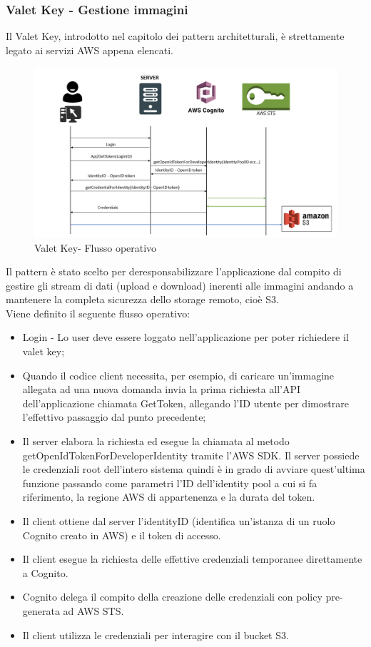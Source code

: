 \documentclass[12pt]{article}
\begin{document}
\subsubsection{Valet Key - Gestione immagini}
\label{sec:valet}
Il Valet Key, introdotto nel capitolo dei pattern architetturali, è strettamente legato ai servizi AWS appena elencati.
\begin{figure}[H]
\includegraphics[scale=0.5, left]{diapAWS.png}
\caption{Valet Key- Flusso operativo}
\end{figure}
Il pattern è stato scelto per deresponsabilizzare l'applicazione dal compito di gestire gli stream di dati (upload e download) inerenti alle immagini andando a mantenere la completa sicurezza dello storage remoto, cioè S3.\\
Viene definito il seguente flusso operativo:
\begin{itemize}
\item Login - Lo user deve essere loggato nell'applicazione per poter richiedere il valet key;
\item Quando il codice client necessita, per esempio, di caricare un'immagine allegata ad una nuova domanda invia la prima richiesta all'API dell'applicazione chiamata GetToken, allegando l'ID utente per dimostrare l'effettivo passaggio dal punto precedente;
\item Il server elabora la richiesta ed esegue la chiamata al metodo getOpenIdTokenForDeveloperIdentity tramite l'AWS SDK. Il server possiede le credenziali root dell'intero sistema quindi è in grado di avviare quest'ultima funzione passando come parametri l'ID dell'identity pool a cui si fa riferimento, la regione AWS di appartenenza e la durata del token.
\item Il client ottiene dal server l'identityID (identifica un'istanza di un ruolo Cognito creato in AWS) e il token di accesso.
\item Il client esegue la richiesta delle effettive credenziali temporanee direttamente a Cognito.
\item Cognito delega il compito della creazione delle credenziali con policy pre-generata ad AWS STS.
\item Il client utilizza le credenziali per interagire con il bucket S3.
\end{itemize}
\end{document}
